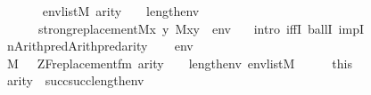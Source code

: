 \begin{isabellebody}
\ \ \ {\isasymlongleftrightarrow}\isanewline
\ \ \ {\isacharparenleft}{\kern0pt}{\isasymforall}env{\isasymin}list{\isacharparenleft}{\kern0pt}M{\isacharparenright}{\kern0pt}{\isachardot}{\kern0pt}\ arity{\isacharparenleft}{\kern0pt}{\isasymphi}{\isacharparenright}{\kern0pt}\ {\isasymle}\ {}\ {\isacharhash}{\kern0pt}{\isacharplus}{\kern0pt}\ length{\isacharparenleft}{\kern0pt}env{\isacharparenright}{\kern0pt}\ {\isasymlongrightarrow}\ \isanewline
\ \ \ \ \ \ strong{\isacharunderscore}{\kern0pt}replacement{\isacharparenleft}{\kern0pt}{\isacharhash}{\kern0pt}{\isacharhash}{\kern0pt}M{\isacharcomma}{\kern0pt}{\isasymlambda}x\ y{\isachardot}{\kern0pt}\ M{\isacharcomma}{\kern0pt}{\isacharbrackleft}{\kern0pt}x{\isacharcomma}{\kern0pt}y{\isacharbrackright}{\kern0pt}\ {\isacharat}{\kern0pt}\ env\ {\isasymTurnstile}\ {\isasymphi}{\isacharparenright}{\kern0pt}{\isacharparenright}{\kern0pt}{\isachardoublequoteclose}\isanewline
%
\isadelimproof
%
\endisadelimproof
%
\isatagproof
{}\isamarkupfalse%
\ {\isacharparenleft}{\kern0pt}intro\ iffI\ ballI\ impI{\isacharparenright}{\kern0pt}\isanewline
\ \ \isamarkupfalse%
\ {\isacharquery}{\kern0pt}n{\isacharequal}{\kern0pt}{\isachardoublequoteopen}Arith{\isachardot}{\kern0pt}pred{\isacharparenleft}{\kern0pt}Arith{\isachardot}{\kern0pt}pred{\isacharparenleft}{\kern0pt}arity{\isacharparenleft}{\kern0pt}{\isasymphi}{\isacharparenright}{\kern0pt}{\isacharparenright}{\kern0pt}{\isacharparenright}{\kern0pt}{\isachardoublequoteclose}\isanewline
\ \ \isamarkupfalse%
\ env\isanewline
\ \ \isamarkupfalse%
\ {\isachardoublequoteopen}M{\isacharcomma}{\kern0pt}\ {\isacharbrackleft}{\kern0pt}{\isacharbrackright}{\kern0pt}\ {\isasymTurnstile}\ ZF{\isacharunderscore}{\kern0pt}replacement{\isacharunderscore}{\kern0pt}fm{\isacharparenleft}{\kern0pt}{\isasymphi}{\isacharparenright}{\kern0pt}{\isachardoublequoteclose}\ {\isachardoublequoteopen}arity{\isacharparenleft}{\kern0pt}{\isasymphi}{\isacharparenright}{\kern0pt}\ {\isasymle}\ {}\ {\isacharhash}{\kern0pt}{\isacharplus}{\kern0pt}\ length{\isacharparenleft}{\kern0pt}env{\isacharparenright}{\kern0pt}{\isachardoublequoteclose}\ {\isachardoublequoteopen}env{\isasymin}list{\isacharparenleft}{\kern0pt}M{\isacharparenright}{\kern0pt}{\isachardoublequoteclose}\isanewline
\ \ \isamarkupfalse%
\ \isamarkupfalse%
\ this\isanewline
\ \ \isamarkupfalse%
\ {\isachardoublequoteopen}arity{\isacharparenleft}{\kern0pt}{\isasymphi}{\isacharparenright}{\kern0pt}\ {\isasymle}\ succ{\isacharparenleft}{\kern0pt}succ{\isacharparenleft}{\kern0pt}length{\isacharparenleft}{\kern0pt}env{\isacharparenright}{\kern0pt}{\isacharparenright}{\kern0pt}{\isacharparenright}{\kern0pt}{\isachardoublequoteclose}\ \isamarkupfalse%

\end{isabellebody}

